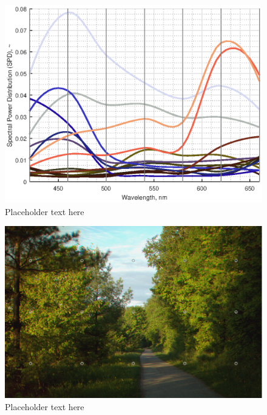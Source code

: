 \documentclass[twocolumn,10pt]{asme2ej}
\begin{document}
\begin{figure}[H]
\begin{centering}
  \includegraphics[height=0.6\linewidth]{broccoli_bottle_tomato.eps}
  \caption{Placeholder text here}
  \label{tomato_SPDs}
  \end{centering}
\end{figure}

\clearpage

\begin{figure}[H]
\begin{centering}
  \includegraphics[height=0.55\linewidth]{vermont_path.png}
  \caption{Placeholder text here}
  \label{tomato_mesh}
  \end{centering}
\end{figure}
\end{document}
